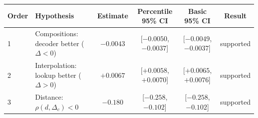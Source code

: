\begin{tabular}{llcccc}
\toprule
Order & Hypothesis & Estimate & Percentile 95\% CI & Basic 95\% CI & Result \\
\midrule
1 & Compositions: decoder better ($\Delta<0$) & $-0.0043$ & [$-0.0050$, $-0.0037$] & [$-0.0049$, $-0.0037$] & supported \\
2 & Interpolation: lookup better ($\Delta>0$) & $+0.0067$ & [$+0.0058$, $+0.0070$] & [$+0.0065$, $+0.0076$] & supported \\
3 & Distance: $\rho(d,\Delta_c)<0$ & $-0.180$ & [$-0.258$, $-0.102$] & [$-0.258$, $-0.102$] & supported \\
\bottomrule
\end{tabular}
